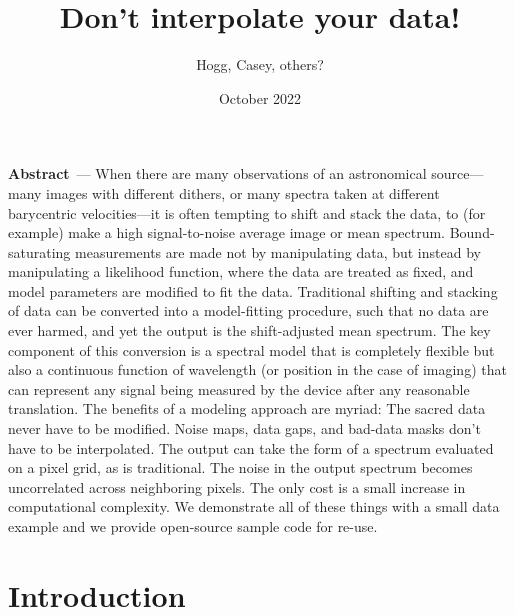 \documentclass[11pt]{article}
\title{\bfseries%
Don't interpolate your data!}
\author{Hogg, Casey, others?}
\date{October 2022}
\renewcommand{\paragraph}[1]{\medskip\par\noindent\textbf{#1}~---}
\begin{document}
\maketitle

\paragraph{Abstract}
When there are many observations of an astronomical source---many images with different dithers, or many spectra taken at different barycentric velocities---it is often tempting to shift and stack the data, to (for example) make a high signal-to-noise average image or mean spectrum.
Bound-saturating measurements are made not by manipulating data, but instead by manipulating a likelihood function, where the data are treated as fixed, and model parameters are modified to fit the data.
Traditional shifting and stacking of data can be converted into a model-fitting procedure, such that no data are ever harmed, and yet the output is the shift-adjusted mean spectrum.
The key component of this conversion is a spectral model that is completely flexible but also a continuous function of wavelength (or position in the case of imaging) that can represent any signal being measured by the device after any reasonable translation.
The benefits of a modeling approach are myriad:
The sacred data never have to be modified.
Noise maps, data gaps, and bad-data masks don't have to be interpolated.
The output can take the form of a spectrum evaluated on a pixel grid, as is traditional.
The noise in the output spectrum becomes uncorrelated across neighboring pixels.
The only cost is a small increase in computational complexity.
We demonstrate all of these things with a small data example and we provide open-source sample code for re-use.

\section{Introduction}\label{sec:intro}
\end{document}
